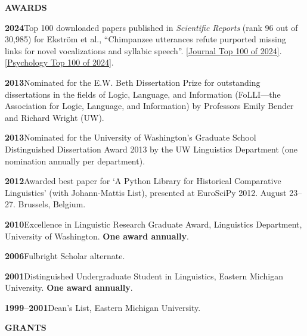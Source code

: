 \documentclass[11pt]{article}
\newcommand{\hangpara}{
 \setlength{\parindent}{0in} %
 \hangindent=0.42in %
}
\begin{document}
\vskip 20pt
\begin{flushleft}
{\bf AWARDS}
\end{flushleft}

\hangpara
{\bf 2024}\hspace{1ex}Top 100 downloaded papers published in \textit{Scientific Reports} (rank 96 out of 30,985) for Ekström et al., ``Chimpanzee utterances refute purported missing links for novel vocalizations and syllabic speech''. \href{https://www.nature.com/collections/afjdaicdhg}{[Journal Top 100 of 2024]}. \href{https://www.nature.com/collections/bghjhfeegc}{[Psychology Top 100 of 2024]}.


\vskip 6pt
\hangpara
{\bf 2013}\hspace{1ex}Nominated for the E.W. Beth Dissertation Prize for outstanding dissertations in the fields of Logic, Language, and Information (FoLLI---the Association for Logic, Language, and Information) by Professors Emily Bender and Richard Wright (UW).

\vskip 6pt
\hangpara
{\bf 2013}\hspace{1ex}Nominated for the University of Washington's Graduate School Distinguished Dissertation Award 2013 by the UW Linguistics Department (one nomination annually per department).

\vskip 6pt
\hangpara
{\bf 2012}\hspace{1ex}Awarded best paper for `A Python Library for Historical Comparative Linguistics' (with Johann-Mattis List), presented at EuroSciPy 2012. August 23--27. Brussels, Belgium.

\vskip 6pt
\hangpara
{\bf 2010}\hspace{1ex}Excellence in Linguistic Research Graduate Award, Linguistics Department, University of Washington. \textbf{One award annually}.

\vskip 6pt
\hangpara
{\bf 2006}\hspace{1ex}Fulbright Scholar alternate.

\vskip 6pt
\hangpara
{\bf 2001}\hspace{1ex}Distinguished Undergraduate Student in Linguistics, Eastern Michigan University. \textbf{One award annually}.

\vskip 6pt
\hangpara
{\bf 1999--2001}\hspace{1ex}Dean's List, Eastern Michigan University.

\vskip 20pt
\begin{flushleft}
{\bf GRANTS}
\end{flushleft}
\end{document}
